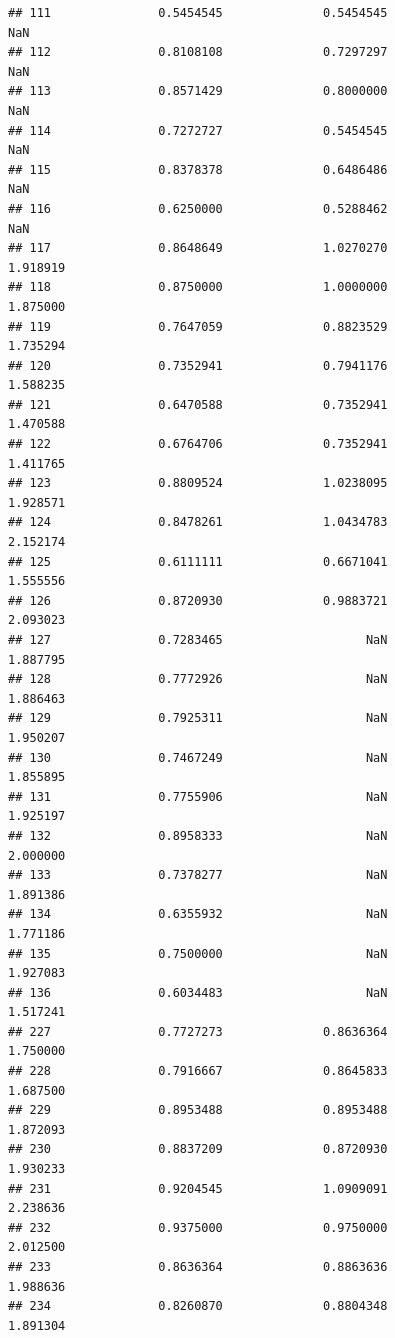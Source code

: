 \documentclass[]{article}
\begin{document}
\begin{verbatim}
## 111               0.5454545              0.5454545                    NaN
## 112               0.8108108              0.7297297                    NaN
## 113               0.8571429              0.8000000                    NaN
## 114               0.7272727              0.5454545                    NaN
## 115               0.8378378              0.6486486                    NaN
## 116               0.6250000              0.5288462                    NaN
## 117               0.8648649              1.0270270               1.918919
## 118               0.8750000              1.0000000               1.875000
## 119               0.7647059              0.8823529               1.735294
## 120               0.7352941              0.7941176               1.588235
## 121               0.6470588              0.7352941               1.470588
## 122               0.6764706              0.7352941               1.411765
## 123               0.8809524              1.0238095               1.928571
## 124               0.8478261              1.0434783               2.152174
## 125               0.6111111              0.6671041               1.555556
## 126               0.8720930              0.9883721               2.093023
## 127               0.7283465                    NaN               1.887795
## 128               0.7772926                    NaN               1.886463
## 129               0.7925311                    NaN               1.950207
## 130               0.7467249                    NaN               1.855895
## 131               0.7755906                    NaN               1.925197
## 132               0.8958333                    NaN               2.000000
## 133               0.7378277                    NaN               1.891386
## 134               0.6355932                    NaN               1.771186
## 135               0.7500000                    NaN               1.927083
## 136               0.6034483                    NaN               1.517241
## 227               0.7727273              0.8636364               1.750000
## 228               0.7916667              0.8645833               1.687500
## 229               0.8953488              0.8953488               1.872093
## 230               0.8837209              0.8720930               1.930233
## 231               0.9204545              1.0909091               2.238636
## 232               0.9375000              0.9750000               2.012500
## 233               0.8636364              0.8863636               1.988636
## 234               0.8260870              0.8804348               1.891304

\end{verbatim}
\end{document}
